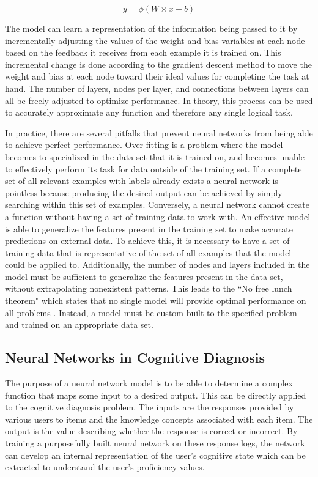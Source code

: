 \documentclass[letterpaper, 12pt, captions=tableabove]{scrreprt}
\begin{document}
			\begin{equation}
				\label{eqn:node}
				y = \phi(W \times x + b)
			\end{equation}

			The model can learn a representation of the information being passed to it by incrementally adjusting the values of the weight and bias variables at each node based on the feedback it receives from each example it is trained on. This incremental change is done according to the gradient descent method to move the weight and bias at each node toward their ideal values for completing the task at hand. The number of layers, nodes per layer, and connections between layers can all be freely adjusted to optimize performance. In theory, this process can be used to accurately approximate any function and therefore any single logical task\cite{bengio2017}.

			In practice, there are several pitfalls that prevent neural networks from being able to achieve perfect performance. Over-fitting is a problem where the model becomes to specialized in the data set that it is trained on, and becomes unable to effectively perform its task for data outside of the training set. If a complete set of all relevant examples with labels already exists a neural network is pointless because producing the desired output can be achieved by simply searching within this set of examples. Conversely, a neural network cannot create a function without having a set of training data to work with. An effective model is able to generalize the features present in the training set to make accurate predictions on external data. To achieve this, it is necessary to have a set of training data that is representative of the set of all examples that the model could be applied to. Additionally, the number of nodes and layers included in the model must be sufficient to generalize the features present in the data set, without extrapolating nonexistent patterns. This leads to the ``No free lunch theorem" which states that no single model will provide optimal performance on all problems \cite{wolpert1997}. Instead, a model must be custom built to the specified problem and trained on an appropriate data set. 

		\subsection{Neural Networks in Cognitive Diagnosis}
		\label{sub:neuralNetworksInCognitiveDiagnosis}

			The purpose of a neural network model is to be able to determine a complex function that maps some input to a desired output. This can be directly applied to the cognitive diagnosis problem. The inputs are the responses provided by various users to items and the knowledge concepts associated with each item. The output is the value describing whether the response is correct or incorrect. By training a purposefully built neural network on these response logs, the network can develop an internal representation of the user's cognitive state which can be extracted to understand the user's proficiency values.
\end{document}
